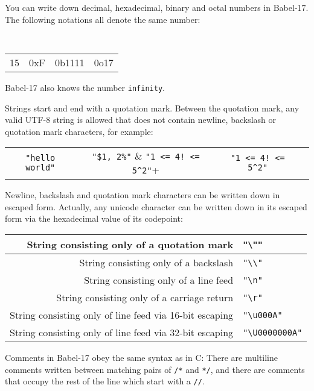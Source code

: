 \documentclass[11pt]{amsart}
\newcommand{\babelsrc}[1] {\lstinline!#1!}
\begin{document}
You can write down decimal, hexadecimal, binary and octal numbers in Babel-17. The following notations all denote the same number:
\begin{center}
\tt
\begin{tabular}{cccc}
15 & 0xF & 0b1111 &  0o17
\end{tabular}
\end{center}
Babel-17 also knows the number \babelsrc{infinity}.

Strings start and end with a quotation mark. Between the quotation mark, any valid UTF-8 string is allowed that does not contain newline, backslash or quotation mark characters, for example:
\begin{center}
\begin{tabular}{cccc}
\verb+"hello world"+ & \verb+"$1, 2%"+ & \verb+"1 <= 4! <= 5^2"+
\end{tabular}
\end{center}
Newline, backslash and quotation mark characters can be written down in escaped form. Actually, any unicode character can be written down in its escaped form via the hexadecimal value of its codepoint: 
\begin{center}
\begin{tabular}{r|l}
String consisting only of a quotation mark & \verb+"\""+\\\hline
String consisting only of a backslash & \verb+"\\"+ \\\hline
String consisting only of a line feed & \verb+"\n"+ \\\hline
String consisting only of a carriage return & \verb+"\r"+ \\\hline
String consisting only of line feed via 16-bit escaping & \verb+"\u000A"+ \\\hline
String consisting only of line feed via 32-bit escaping & \verb+"\U0000000A"+
\end{tabular}
\end{center}

Comments in Babel-17 obey the same syntax as in C: There are multiline comments written between matching pairs of \verb+/*+ and \verb+*/+, and there are comments that occupy the rest of the line which start with a \verb+//+.
\end{document}
